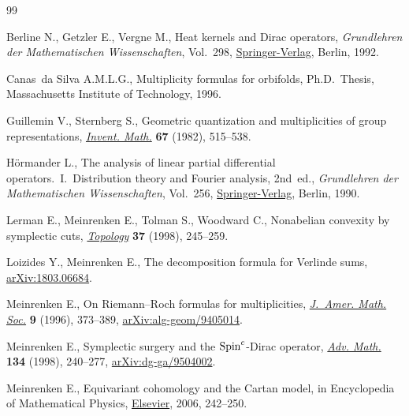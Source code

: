 \documentclass[pdftex]{sigma}
\numberwithin{equation}{section}
\begin{document}
\begin{thebibliography}{99}
\footnotesize\itemsep=0pt

Berline N., Getzler E., Vergne M., Heat kernels and {D}irac operators,
 \textit{Grundlehren der Mathematischen Wissenschaften}, Vol.~298,
 \href{https://doi.org/10.1007/978-3-642-58088-8}{Springer-Verlag}, Berlin, 1992.

Canas~da Silva A.M.L.G., Multiplicity formulas for orbifolds, Ph.D.~Thesis,
 {M}assachusetts Institute of Technology, 1996.

Guillemin V., Sternberg S., Geometric quantization and multiplicities of group
 representations, \href{https://doi.org/10.1007/BF01398934}{\textit{Invent. Math.}} \textbf{67} (1982), 515--538.

H\"{o}rmander L., The analysis of linear partial differential
 operators.~{I}.~Distribution theory and Fourier ana\-ly\-sis, 2nd~ed., \textit{Grundlehren
 der Mathematischen Wissenschaften}, Vol.~256, \href{https://doi.org/10.1007/978-3-642-61497-2}{Springer-Verlag},
 Berlin, 1990.

Lerman E., Meinrenken E., Tolman S., Woodward C., Nonabelian convexity by
 symplectic cuts, \href{https://doi.org/10.1016/S0040-9383(97)00030-X}{\textit{Topology}} \textbf{37} (1998), 245--259.

Loizides Y., Meinrenken E., The decomposition formula for {V}erlinde sums,
 \href{https://arxiv.org/abs/1803.06684}{arXiv:1803.06684}.

Meinrenken E., On {R}iemann--{R}och formulas for multiplicities,
 \href{https://doi.org/10.1090/S0894-0347-96-00197-X}{\textit{J.~Amer. Math. Soc.}} \textbf{9} (1996), 373--389,
 \href{https://arxiv.org/abs/alg-geom/9405014}{arXiv:alg-geom/9405014}.

Meinrenken E., Symplectic surgery and the {${\rm Spin}^c$}-{D}irac operator,
 \href{https://doi.org/10.1006/aima.1997.1701}{\textit{Adv. Math.}} \textbf{134} (1998), 240--277, \href{https://arxiv.org/abs/dg-ga/9504002}{arXiv:dg-ga/9504002}.

Meinrenken E., Equivariant cohomology and the {C}artan model, in Encyclopedia
 of Mathematical Physics, \href{https://doi.org/10.1016/b0-12-512666-2/00344-8}{Elsevier}, 2006, 242--250.


\end{thebibliography}
\end{document}
